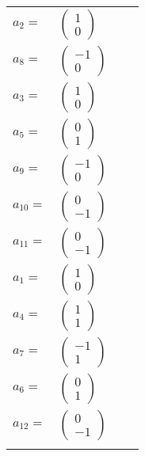 \documentclass[1p]{elsarticle_modified}
\theoremstyle{definition}
\begin{document}
\begin{tabular}{m{7pt} m{180pt} m{7pt} m{180pt} }
\flushright $a_{2}=$&$\begin{pmatrix}1\\0\end{pmatrix}$ \\
\flushright $a_{8}=$&$\begin{pmatrix}-1\\0\end{pmatrix}$ \\
\flushright $a_{3}=$&$\begin{pmatrix}1\\0\end{pmatrix}$ \\
\flushright $a_{5}=$&$\begin{pmatrix}0\\1\end{pmatrix}$ \\
\flushright $a_{9}=$&$\begin{pmatrix}-1\\0\end{pmatrix}$ \\
\flushright $a_{10}=$&$\begin{pmatrix}0\\-1\end{pmatrix}$ \\
\flushright $a_{11}=$&$\begin{pmatrix}0\\-1\end{pmatrix}$ \\
\flushright $a_{1}=$&$\begin{pmatrix}1\\0\end{pmatrix}$ \\
\flushright $a_{4}=$&$\begin{pmatrix}1\\1\end{pmatrix}$ \\
\flushright $a_{7}=$&$\begin{pmatrix}-1\\1\end{pmatrix}$ \\
\flushright $a_{6}=$&$\begin{pmatrix}0\\1\end{pmatrix}$ \\
\flushright $a_{12}=$&$\begin{pmatrix}0\\-1\end{pmatrix}$\\&\end{tabular}
\end{document}
